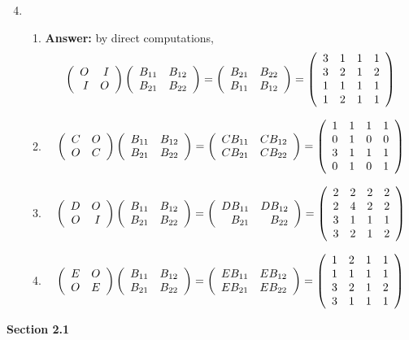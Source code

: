 \documentclass[8pt]{article} %
\begin{document}
\begin{enumerate}[1]
	\setcounter{enumi}{3}
	\item 
		\begin{enumerate}[\bf(a)]
			\item {\bf Answer: }by direct computations,
				\[\left(\begin{array}{rr}O&I\\I&O\end{array}\right)\left(\begin{array}{rr}B_{11}&B_{12}\\B_{21}&B_{22}\end{array}\right)=
				\left(\begin{array}{rr}B_{21}&B_{22}\\B_{11}&B_{12}\end{array}\right)=
\left(\begin{array}{rrrr}
3&1&1&1\\
3&2&1&2\\
1&1&1&1\\
1&2&1&1\\
\end{array}\right)
				\]
			\item 
				\[\left(\begin{array}{rr}C&O\\O&C\end{array}\right)\left(\begin{array}{rr}B_{11}&B_{12}\\B_{21}&B_{22}\end{array}\right)=
				\left(\begin{array}{rr}CB_{11}&CB_{12}\\CB_{21}&CB_{22}\end{array}\right)=
\left(\begin{array}{rrrr}
1&1&1&1\\
0&1&0&0\\
3&1&1&1\\
0&1&0&1\\
\end{array}\right)
				\]
			\item 
				\[\left(\begin{array}{rr}D&O\\O&I\end{array}\right)\left(\begin{array}{rr}B_{11}&B_{12}\\B_{21}&B_{22}\end{array}\right)=
				\left(\begin{array}{rr}DB_{11}&DB_{12}\\B_{21}&B_{22}\end{array}\right)=
\left(\begin{array}{rrrr}2&2&2&2\\2&4&2&2\\3&1&1&1\\3&2&1&2\end{array}\right)
				\]
			\item 
				\[\left(\begin{array}{rr}E&O\\O&E\end{array}\right)\left(\begin{array}{rr}B_{11}&B_{12}\\B_{21}&B_{22}\end{array}\right)=
				\left(\begin{array}{rr}EB_{11}&EB_{12}\\EB_{21}&EB_{22}\end{array}\right)=
\left(\begin{array}{rrrr}1&2&1&1\\1&1&1&1\\3&2&1&2\\3&1&1&1\end{array}\right)
				\]
		\end{enumerate}
\end{enumerate}
\textbf{Section 2.1}
\end{document}
